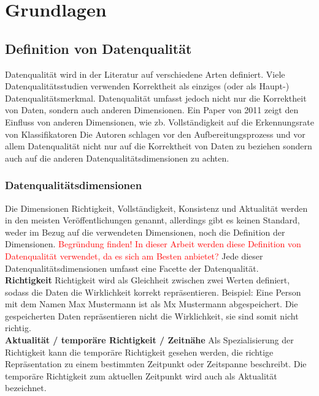 \chapter{Grundlagen}\label{ch:data}

\section{Definition von Datenqualität}
Datenqualität wird in der Literatur auf verschiedene Arten definiert. 
Viele Datenqualitätsstudien verwenden Korrektheit als einziges (oder als Haupt-) Datenqualitätsmerkmal. \cite{wang1996}
Datenqualität umfasst jedoch nicht nur die Korrektheit von Daten, sondern auch anderen Dimensionen. 
Ein Paper von 2011 zeigt den Einfluss von anderen Dimensionen, wie zb. Vollständigkeit auf die Erkennungsrate von Klassifikatoren \cite{espinosaoliva2011} Die Autoren schlagen vor den Aufbereitungsprozess und vor allem Datenqualität nicht nur auf die Korrektheit von Daten zu beziehen sondern auch auf die anderen Datenqualitätsdimensionen zu achten.

\subsection{Datenqualitätsdimensionen}
Die Dimensionen Richtigkeit, Vollständigkeit, Konsistenz und Aktualität werden in den meisten Veröffentlichungen genannt, allerdings gibt es keinen Standard, weder im Bezug auf die verwendeten Dimensionen, noch die Definition der Dimensionen. \cite{scannapieco2002}
\textcolor{red}{Begründung finden! In dieser Arbeit werden diese Definition von Datenqualität verwendet, da es sich am Besten anbietet?}
Jede dieser Datenqualitätsdimensionen umfasst eine Facette der Datenqualität.
\\ \textbf{Richtigkeit}
Richtigkeit wird als Gleichheit zwischen zwei Werten definiert, sodass die Daten die Wirklichkeit korrekt repräsentieren. 
Beispiel: Eine Person mit dem Namen Max Mustermann ist als Mx Mustermann abgespeichert. 
Die gespeicherten Daten repräsentieren nicht die Wirklichkeit, sie sind somit nicht richtig.
\\ \textbf{Aktualität / temporäre Richtigkeit / Zeitnähe}
Als Spezialisierung der Richtigkeit kann die temporäre Richtigkeit gesehen werden, die richtige Repräsentation zu einem bestimmten Zeitpunkt oder Zeitspanne beschreibt. 
Die temporäre Richtigkeit zum aktuellen Zeitpunkt wird auch als Aktualität bezeichnet. \\

